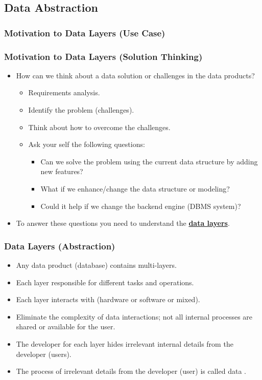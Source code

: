 \VideoClassification[column=2, colour=blue]
\subsection{Data Abstraction}
\begin{frame}
	\frametitle{Motivation to Data Layers (Use Case)}	
		

\end{frame}
\begin{frame}
	\frametitle{Motivation to Data Layers (Solution Thinking)}
	
	\begin{itemize}[<+->]
		\item How can we think about a data solution or challenges in the data products?
		\begin{itemize}[<+->]
			\item Requirements analysis.
			\item Identify the problem (challenges).
			\item Think about how to overcome the challenges.
			\item Ask your self the following questions:
			\begin{itemize}[<+->]
				\item Can we solve the problem using the current data structure by adding new features?
				\item What if we enhance/change the data structure or modeling?
				\item Could it help if we change the backend engine \forexample (DBMS system)?
			\end{itemize}			
		\end{itemize}
		\item To answer these questions you need to understand the \textbf{\underline{data layers}}.
	\end{itemize}
	
\end{frame}
\begin{frame}
	\frametitle{Data Layers (Abstraction)}
	\begin{itemize}[<+->]
		\item Any data product (database) contains multi-layers.
		\item Each layer responsible for different tasks and operations.
		\item Each layer interacts with (hardware or software or mixed).
		\item Eliminate the complexity of data interactions; not all internal processes are shared or available for the user.
		\item The developer for each layer hides irrelevant internal details from the developer (users). 
		\item The process of \textbf{\underline{}} irrelevant details from the developer (user) is called data \textbf{\underline{}}.
	\end{itemize}	
\end{frame}
